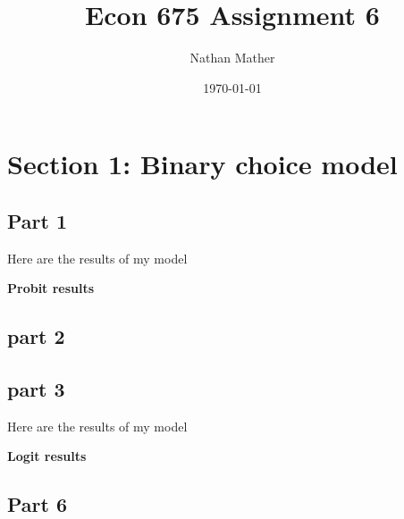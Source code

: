 \documentclass[11pt]{article}
\title{Econ 675 Assignment 6} %
\author{Nathan Mather}  %
\date{\today} %
\begin{document}
	
\maketitle %

\setcounter{tocdepth}{2} %

\tableofcontents %



\section{Section 1: Binary choice model}

\subsection{Part 1}
Here are the results of my model 

\begin{center}
	\centering
	\textbf{Probit results}\par\medskip
	\scalebox{1}{
		
	}
\end{center}

\subsection{part 2}

\subsection{part 3}
Here are the results of my model 

\begin{center}
	\centering
	\textbf{Logit results}\par\medskip
	\scalebox{1}{
		
	}
\end{center}

\subsection{Part 6}
\end{document}
